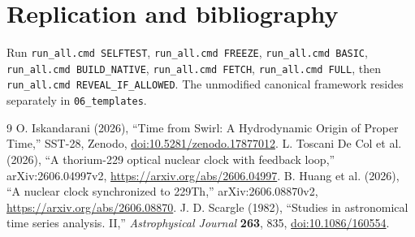 \documentclass[11pt,a4paper]{article}
\begin{document}
\section{Replication and bibliography}
Run \texttt{run\_all.cmd SELFTEST}, \texttt{run\_all.cmd FREEZE}, \texttt{run\_all.cmd BASIC}, \texttt{run\_all.cmd BUILD\_NATIVE}, \texttt{run\_all.cmd FETCH}, \texttt{run\_all.cmd FULL}, then \texttt{run\_all.cmd REVEAL\_IF\_ALLOWED}. The unmodified canonical framework resides separately in \texttt{06\_templates}.
\begin{thebibliography}{9}
 O. Iskandarani (2026), ``Time from Swirl: A Hydrodynamic Origin of Proper Time,'' SST-28, Zenodo, \href{https://doi.org/10.5281/zenodo.17877012}{doi:10.5281/zenodo.17877012}.
 L. Toscani De Col et al. (2026), ``A thorium-229 optical nuclear clock with feedback loop,'' arXiv:2606.04997v2, \url{https://arxiv.org/abs/2606.04997}.
 B. Huang et al. (2026), ``A nuclear clock synchronized to 229Th,'' arXiv:2606.08870v2, \url{https://arxiv.org/abs/2606.08870}.
 J. D. Scargle (1982), ``Studies in astronomical time series analysis. II,'' \emph{Astrophysical Journal} \textbf{263}, 835, \href{https://doi.org/10.1086/160554}{doi:10.1086/160554}.
\end{thebibliography}
\end{document}
